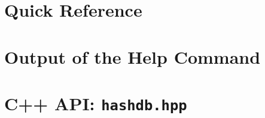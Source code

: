 \documentclass[11pt,fleqn]{article} %
\begin{document}
 


\newpage
\appendix
\appendixpage

\section{\hdb Quick Reference}
\label{QuickReference}

\newpage

\section{Output of the \hdb Help Command}
\label{HelpOutput}
\begingroup
\footnotesize
{
\selectfont

}
\endgroup


\section{\hdb C++ API: \texttt{hashdb.hpp}}
\label{hashdbapi}
\lstset{language=C++}
\lstset{basicstyle=\footnotesize}
\lstset{breaklines=true}
\lstset{breakatwhitespace=true}

\end{document}
